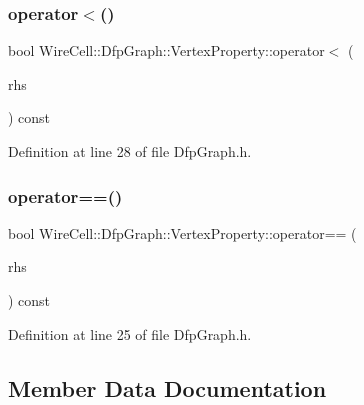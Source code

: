 \subsubsection{\texorpdfstring{operator$<$()}{operator<()}}
{\footnotesize\ttfamily bool Wire\+Cell\+::\+Dfp\+Graph\+::\+Vertex\+Property\+::operator$<$ (\begin{DoxyParamCaption}\item[{const \hyperlink{struct_wire_cell_1_1_dfp_graph_1_1_vertex_property}{Vertex\+Property} \&}]{rhs }\end{DoxyParamCaption}) const\hspace{0.3cm}{\ttfamily [inline]}}



Definition at line 28 of file Dfp\+Graph.\+h.

\mbox{\label{struct_wire_cell_1_1_dfp_graph_1_1_vertex_property_a21acb1b8b4e4c8444928de9b3c140289}} 
\subsubsection{\texorpdfstring{operator==()}{operator==()}}
{\footnotesize\ttfamily bool Wire\+Cell\+::\+Dfp\+Graph\+::\+Vertex\+Property\+::operator== (\begin{DoxyParamCaption}\item[{const \hyperlink{struct_wire_cell_1_1_dfp_graph_1_1_vertex_property}{Vertex\+Property} \&}]{rhs }\end{DoxyParamCaption}) const\hspace{0.3cm}{\ttfamily [inline]}}



Definition at line 25 of file Dfp\+Graph.\+h.



\subsection{Member Data Documentation}
\mbox{\label{struct_wire_cell_1_1_dfp_graph_1_1_vertex_property_a0c08a501c898e624ccc604b3601e2351}} 
